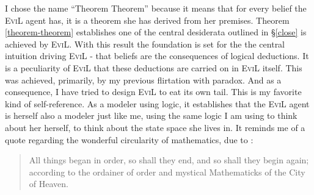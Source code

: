 I chose the name ``Theorem Theorem'' because it means that for every
belief the \textsc{EviL} agent has, it is a theorem she has derived
from her premises. Theorem \ref{theorem-theorem} establishes one of
the central desiderata outlined in \S\ref{close} is achieved by
\textsc{EviL}.  With this result the foundation is set for the the
central intuition driving \textsc{EviL} - that beliefs are the
consequences of logical deductions.  It is a peculiarity of
\textsc{EviL} that these deductions are carried on in \textsc{EviL}
itself.  This was achieved, primarily, by my previous flirtation with
paradox.  And as a consequence, I have tried to design \textsc{EviL}
to eat its own tail. This is my favorite kind of self-reference. As a
modeler using logic, it establishes that the \textsc{EviL} agent is
herself also a modeler just like me, using the same logic I am using
to think about her herself, to think about the state space she lives
in.  It reminds me of a quote regarding the wonderful circularity of
mathematics, due to \citet{browne_garden_1736}:
\begin{quote}
All things began in order, so shall they end, and so shall they begin
again; according to the ordainer of order and mystical Mathematicks of
the City of Heaven.\end{quote}

